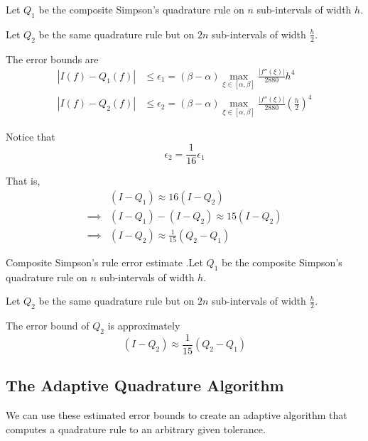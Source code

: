 \documentclass[12pt,letterpaper]{article}
\begin{document}
Let $Q_1$ be the composite Simpson's quadrature rule on $n$ sub-intervals of width $h$.

Let $Q_2$ be the same quadrature rule but on $2n$ sub-intervals of width $\frac{h}{2}$.

The error bounds are
\begin{align}
	\left| I(f) - Q_1(f) \right| &\leq \epsilon_1 = (\beta - \alpha) \max_{\xi \in [\alpha, \beta]} \frac{\big| f''(\xi) \big|}{2880} h^4 \\
	\left| I(f) - Q_2(f) \right| &\leq \epsilon_2 = (\beta - \alpha) \max_{\xi \in [\alpha, \beta]} \frac{\big| f''(\xi) \big|}{2880} \left( \frac{h}{2} \right)^4
\end{align}

Notice that
\begin{equation}
	\epsilon_2 = \frac{1}{16} \epsilon_1
\end{equation}

That is,
\begin{align}
	& ( I - Q_1 ) \approx 16 ( I - Q_2 ) \\
	\implies & ( I - Q_1 ) - ( I - Q_2) \approx 15 (I - Q_2) \\
	\implies & (I - Q_2) \approx \frac{1}{15} (Q_2 - Q_1)
\end{align}

\begin{theo}{Composite Simpson's rule error estimate}
.Let $Q_1$ be the composite Simpson's quadrature rule on $n$ sub-intervals of width $h$.

Let $Q_2$ be the same quadrature rule but on $2n$ sub-intervals of width $\frac{h}{2}$.

\medskip

The error bound of $Q_2$ is approximately
\begin{equation}
	(I - Q_2) \approx \frac{1}{15} (Q_2 - Q_1)
\end{equation}
\label{thm:comp_Simpson_error_est}
\end{theo}

\subsection{The Adaptive Quadrature Algorithm}
We can use these estimated error bounds to create an adaptive algorithm that computes a quadrature rule to an arbitrary given tolerance.
\end{document}
